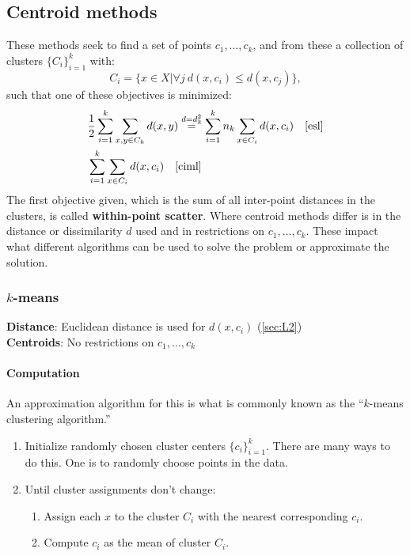 \documentclass[12pt,a4paper]{article}
\newcommand{\1}[1]{\mathds{1}\left[#1\right]}
\newcommand{\R}{\mathbb{R}}
\begin{document}
\subsection{Centroid methods}
These methods seek to find a set of points $c_1,\ldots,c_k$, and from these a collection of clusters $\{C_i\}_{i=1}^k$ with:
\[C_i=\{x\in X|\forall j\ d(x,c_i)\leq d(x,c_j)\},\]
such that one of these objectives is minimized:
\begin{align*}
&\frac{1}{2}\sum_{i=1}^k\sum_{x,y\in C_k}d(x,y)\stackrel{d=d_{\R}^2}= 
\sum_{i=1}^kn_k\sum_{x\in C_i}d(x,c_i)\quad \text{\cite{esl}}\\
&\sum_{i=1}^k\sum_{x\in C_i}d(x,c_i)\quad \text{\cite{ciml}}
\end{align*}
The first objective given, which is the sum of all inter-point distances in the clusters, is called \textbf{within-point scatter}. Where centroid methods differ is in the distance or dissimilarity $d$ used and in restrictions on $c_1,\ldots,c_k$. These impact what different algorithms can be used to solve the problem or approximate the solution.
\subsubsection{\texorpdfstring{$k$}{k}-means}\label{sec:kmeans}
\textbf{Distance}: Euclidean distance is used for $d(x,c_i)$ (\ref{sec:L2})\\
\textbf{Centroids}: No restrictions on $c_1,\ldots,c_k$

\paragraph{Computation}
An approximation algorithm for this is what is commonly known as the ``$k$-means clustering algorithm.''
\begin{enumerate}
    \item Initialize randomly chosen cluster centers $\{c_i\}_{i=1}^k$. There are many ways to do this. One is to randomly choose points in the data.
    \item Until cluster assignments don't change:
        \begin{enumerate}
            \item Assign each $x$ to the cluster $C_i$ with the nearest corresponding $c_i$.
            \item Compute $c_i$ as the mean of cluster $C_i$.
        \end{enumerate}
\end{enumerate}
\iffalse
As an alternative to the $k$-means algorithm, we can define an integer program which minimizes $\sum_{i,j}z_{ij}d(x_i,x_j)$, where $z_{ij}\in \{0,1\}$ represents whether (1) or not (0) $x_i$ and $x_j$ are in the same cluster. Of course there are constraints where $z_{ij}=z{ji}$ and \fi
\end{document}
